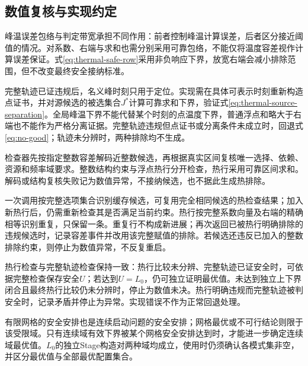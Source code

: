 \subsection*{数值复核与实现约定}
\label{supp:numerical-checks}
\enlargethispage{\baselineskip}

峰温误差包络与判定带宽承担不同作用：前者控制峰温计算误差，后者区分接近阈值的情况。对系数、右端与求和也需分别采用可靠包络，不能仅将温度容差视作计算误差保证。式\eqref{eq:thermal-safe-row}采用非负响应下界，放宽右端会减小排除范围，但不改变最终安全接纳标准。

完整轨迹已证违规后，名义峰时刻只用于定位。实现需在具体可表示时刻重新构造点证书，并对源候选的被选集合\(J^*\)计算可靠求和下界，验证式\eqref{eq:thermal-source-separation}。全局峰温下界不能代替某个时刻的点温度下界，普通浮点和略大于右端也不能作为严格分离证据。完整轨迹违规但点证书或分离条件未成立时，回退式\eqref{eq:no-good}；轨迹未分辨时，两种排除均不生成。

检查器先按指定整数容差解码近整数候选，再根据真实区间复核唯一选择、依赖、资源和频率域要求。整数结构约束与浮点热行分开检查，热行采用可靠区间求和。解码或结构复核失败记为数值异常，不接纳候选，也不据此生成热排除。

一次调用按完整选项集合识别缓存候选，可复用完全相同候选的热检查结果；加入新热行后，仍需重新检查其是否满足当前约束。热行按完整系数向量及右端的精确相等识别重复，只保留一条。重复行不构成新进展；再次返回已被热行明确排除的违规候选时，记录容差事件并改用该完整赋值的排除。若候选还违反已加入的整数排除约束，则停止为数值异常，不反复重启。

热行检查与完整轨迹检查保持一致：热行比较未分辨、完整轨迹已证安全时，可依据完整检查保存安全\(U\)；若达到\(U=L_0\)，仍可独立证明最优值。未达到独立上下界闭合且最终热行比较仍未分辨时，停止为数值未决。热行明确违规而完整轨迹被判安全时，记录矛盾并停止为异常。实现错误不作为正常回退处理。

有限网格的安全安排也是连续启动问题的安全安排；网格最优或不可行结论则限于该受限域。只有连续域有效下界被某个网格安全安排达到时，才能进一步确定连续域最优值。\(L_0\)的独立Stage构造对两种域均成立，使用时仍须确认各模式集非空，并区分最优值与全部最优配置集合。

